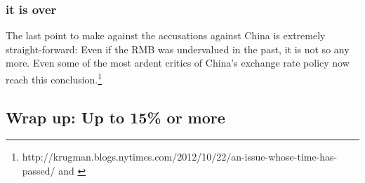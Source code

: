 
\subsubsection{it is over}

The last point to make against the accusations against China is extremely straight-forward: Even if the RMB was undervalued in the past, it is not so any more. Even some of the most ardent critics of China's exchange rate policy now reach this conclusion.\footnote{\cite{Krugman2012}http://krugman.blogs.nytimes.com/2012/10/22/an-issue-whose-time-has-passed/ and \cite{ClineWilliamson2012}} %



\subsection{Wrap up: Up to 15\% or more}



%

